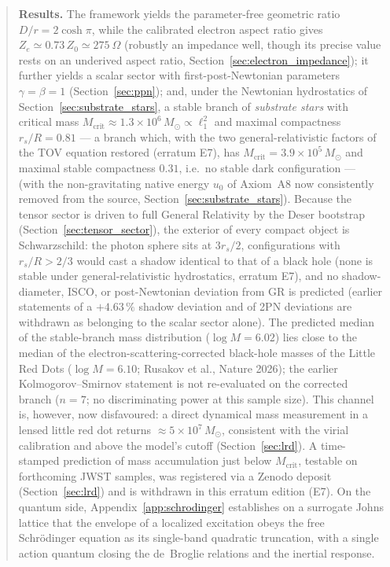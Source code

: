 \documentclass[11pt,a4paper]{article}
\theoremstyle{plain}
\theoremstyle{remark}
\begin{document}
\begin{abstract}
\noindent\textbf{Results.} The framework yields the parameter-free geometric ratio $D/r = 2\cosh\pi$, while the calibrated electron aspect ratio gives $Z_e \simeq 0.73\,Z_0 \simeq 275~\Omega$ (robustly an impedance well, though its precise value rests on an underived aspect ratio, Section~\ref{sec:electron_impedance}); it further yields a scalar sector with first-post-Newtonian parameters $\gamma = \beta = 1$ (Section~\ref{sec:ppn}); and, under the Newtonian hydrostatics of Section~\ref{sec:substrate_stars}, a stable branch of \emph{substrate stars} with critical mass $M_{\text{crit}} \approx 1.3\times10^{6}\,M_\odot \propto \ell_1^2$ and maximal compactness $r_s/R = 0.81$ --- a branch which, with the two general-relativistic factors of the TOV equation restored (erratum E7), has $M_{\text{crit}} = 3.9\times10^{5}\,M_\odot$ and maximal stable compactness $0.31$, i.e.\ no stable dark configuration --- (with the non-gravitating native energy $u_0$ of Axiom~A8 now consistently removed from the source, Section~\ref{sec:substrate_stars}). Because the tensor sector is driven to full General Relativity by the Deser bootstrap (Section~\ref{sec:tensor_sector}), the exterior of every compact object is Schwarzschild: the photon sphere sits at $3r_s/2$, configurations with $r_s/R > 2/3$ would cast a shadow identical to that of a black hole (none is stable under general-relativistic hydrostatics, erratum E7), and no shadow-diameter, ISCO, or post-Newtonian deviation from GR is predicted (earlier statements of a $+4.63\,\%$ shadow deviation and of 2PN deviations are withdrawn as belonging to the scalar sector alone). The predicted median of the stable-branch mass distribution ($\log M = 6.02$) lies close to the median of the electron-scattering-corrected black-hole masses of the Little Red Dots ($\log M = 6.10$; Rusakov et al., Nature 2026); the earlier Kolmogorov--Smirnov statement is not re-evaluated on the corrected branch ($n = 7$; no discriminating power at this sample size). This channel is, however, now disfavoured: a direct dynamical mass measurement in a lensed little red dot returns $\approx 5\times10^{7}\,M_\odot$, consistent with the virial calibration and above the model's cutoff (Section~\ref{sec:lrd}). A time-stamped prediction of mass accumulation just below $M_{\text{crit}}$, testable on forthcoming JWST samples, was registered via a Zenodo deposit (Section~\ref{sec:lrd}) and is withdrawn in this erratum edition (E7). On the quantum side, Appendix~\ref{app:schrodinger} establishes on a surrogate Johns lattice that the envelope of a localized excitation obeys the free Schr\"odinger equation as its single-band quadratic truncation, with a single action quantum closing the de~Broglie relations and the inertial response.


\end{abstract}
\end{document}
